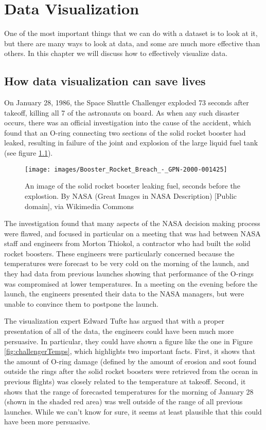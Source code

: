 \documentclass[]{book}
\theoremstyle{definition}
\theoremstyle{definition}
\theoremstyle{definition}
\theoremstyle{remark}
\begin{document}
\chapter{Data Visualization}\label{data-visualization}

One of the most important things that we can do with a dataset is to
look at it, but there are many ways to look at data, and some are much
more effective than others. In this chapter we will discuss how to
effectively visualize data.

\section{How data visualization can save
lives}\label{how-data-visualization-can-save-lives}

On January 28, 1986, the Space Shuttle Challenger exploded 73 seconds
after takeoff, killing all 7 of the astronauts on board. As when any
such disaster occurs, there was an official investigation into the cause
of the accident, which found that an O-ring connecting two sections of
the solid rocket booster had leaked, resulting in failure of the joint
and explosion of the large liquid fuel tank (see figure
\ref{fig:srbLeak}).

\begin{figure}
\texttt{[image: images/Booster\_Rocket\_Breach\_-\_GPN-2000-001425]} \caption{An image of the solid rocket booster leaking fuel, seconds before the explostion. By NASA (Great Images in NASA Description) [Public domain], via Wikimedia Commons}\label{fig:srbLeak}
\end{figure}

The investigation found that many aspects of the NASA decision making
process were flawed, and focused in particular on a meeting that was had
between NASA staff and engineers from Morton Thiokol, a contractor who
had built the solid rocket boosters. These engineers were particularly
concerned because the temperatures were forecast to be very cold on the
morning of the launch, and they had data from previous launches showing
that performance of the O-rings was compromised at lower temperatures.
In a meeting on the evening before the launch, the engineers presented
their data to the NASA managers, but were unable to convince them to
postpone the launch.

The visualization expert Edward Tufte has argued that with a proper
presentation of all of the data, the engineers could have been much more
persuasive. In particular, they could have shown a figure like the one
in Figure \ref{fig:challengerTemps}, which highlights two important
facts. First, it shows that the amount of O-ring damage (defined by the
amount of erosion and soot found outside the rings after the solid
rocket boosters were retrieved from the ocean in previous flights) was
closely related to the temperature at takeoff. Second, it shows that the
range of forecasted temperatures for the morning of January 28 (shown in
the shaded red area) was well outside of the range of all previous
launches. While we can't know for sure, it seems at least plausible that
this could have been more persuasive.
\end{document}
